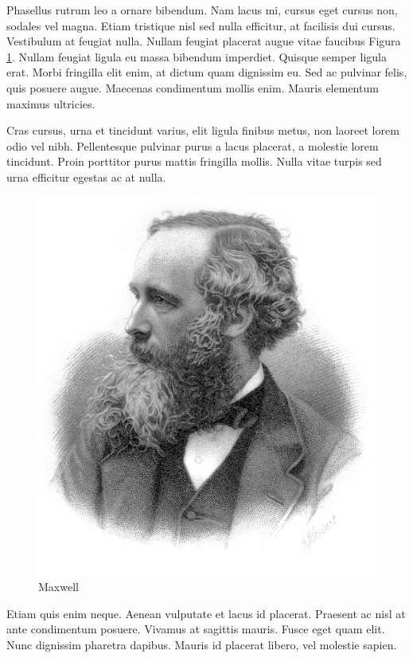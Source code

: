 Phasellus rutrum leo a ornare bibendum. Nam lacus mi, cursus eget cursus non, sodales vel magna. Etiam tristique nisl sed nulla efficitur, at facilisis dui cursus. Vestibulum at feugiat nulla. Nullam feugiat placerat augue vitae faucibus Figura \ref{maxwell}. Nullam feugiat ligula eu massa bibendum imperdiet. Quisque semper ligula erat. Morbi fringilla elit enim, at dictum quam dignissim eu. Sed ac pulvinar felis, quis posuere augue. Maecenas condimentum mollis enim. Mauris elementum maximus ultricies.

\begin{defi}
Cras cursus, urna et tincidunt varius, elit ligula finibus metus, non laoreet lorem odio vel nibh. Pellentesque pulvinar purus a lacus placerat, a molestie lorem tincidunt. Proin porttitor purus mattis fringilla mollis. Nulla vitae turpis sed urna efficitur egestas ac at nulla.
\end{defi}

\begin{figure}[!htb]
    \centering
    \includegraphics[scale=0.7]{James_Clerk_Maxwell_big.jpg}
    \caption{Maxwell}
    \label{maxwell}
\end{figure}

Etiam quis enim neque. Aenean vulputate et lacus id placerat. Praesent ac nisl at ante condimentum posuere. Vivamus at sagittis mauris. Fusce eget quam elit. Nunc dignissim pharetra dapibus. Mauris id placerat libero, vel molestie sapien.

